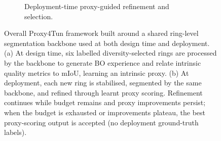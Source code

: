 \documentclass[a4paper,fleqn]{cas-dc}
\begin{document}
{\begin{figure}[t]
\begin{subfigure}{0.98\textwidth}
%

\caption{Deployment-time proxy-guided refinement and selection.}
\end{subfigure}

\caption{
Overall Proxy4Tun framework built around a shared ring-level segmentation backbone used at both design time and deployment.
(a) At design time, six labelled diversity-selected rings are processed by the backbone to generate BO experience and relate intrinsic quality metrics to mIoU, learning an intrinsic proxy.
(b) At deployment, each new ring is stabilised, segmented by the same backbone, and refined through learnt proxy scoring. Refinement continues while budget remains and proxy improvements persist; when the budget is exhausted or improvements plateau, the best proxy-scoring output is accepted (no deployment ground-truth labels).
}
\label{fig:overall_proxy4tun_framework}
\end{figure}

\begin{figure}[t]
\centering

\begin{subfigure}{0.98\textwidth}
\centering
{}
\end{subfigure}
\end{figure}}
\end{document}
